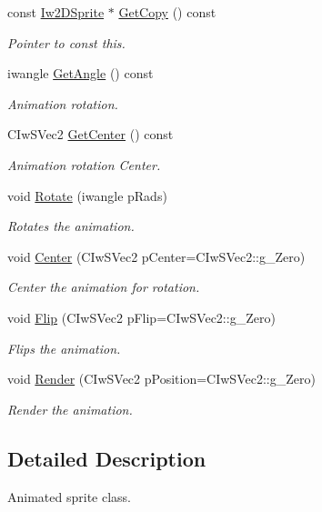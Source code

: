 \begin{DoxyCompactItemize}
const \hyperlink{class_iw2_d_sprite}{Iw2DSprite} $\ast$ \hyperlink{class_iw2_d_sprite_a758299ad3a137adcb5c2d21f70b194e0}{GetCopy} () const 
\begin{DoxyCompactList}\small\item\em Pointer to const this. \end{DoxyCompactList}\item 
iwangle \hyperlink{class_iw2_d_sprite_a64ae396e457f300fcef4de7ce242a79f}{GetAngle} () const 
\begin{DoxyCompactList}\small\item\em Animation rotation. \end{DoxyCompactList}\item 
CIwSVec2 \hyperlink{class_iw2_d_sprite_a2ba203171e9feb9a6c2c6d0b8155cb59}{GetCenter} () const 
\begin{DoxyCompactList}\small\item\em Animation rotation Center. \end{DoxyCompactList}\item 
void \hyperlink{class_iw2_d_sprite_a50d09fd4a9a939ca5464cef76dd35068}{Rotate} (iwangle pRads)
\begin{DoxyCompactList}\small\item\em Rotates the animation. \end{DoxyCompactList}\item 
void \hyperlink{class_iw2_d_sprite_a13b88f977be187015ddb7920e2c53c6c}{Center} (CIwSVec2 pCenter=CIwSVec2::g\_\-Zero)
\begin{DoxyCompactList}\small\item\em Center the animation for rotation. \end{DoxyCompactList}\item 
void \hyperlink{class_iw2_d_sprite_a962579345fd56534e7584ecef3ed7fc3}{Flip} (CIwSVec2 pFlip=CIwSVec2::g\_\-Zero)
\begin{DoxyCompactList}\small\item\em Flips the animation. \end{DoxyCompactList}\item 
void \hyperlink{class_iw2_d_sprite_aa967136ec38fa03f9b650de6c16fbe30}{Render} (CIwSVec2 pPosition=CIwSVec2::g\_\-Zero)
\begin{DoxyCompactList}\small\item\em Render the animation. \end{DoxyCompactList}\end{DoxyCompactItemize}


\subsection{Detailed Description}
Animated sprite class. 

